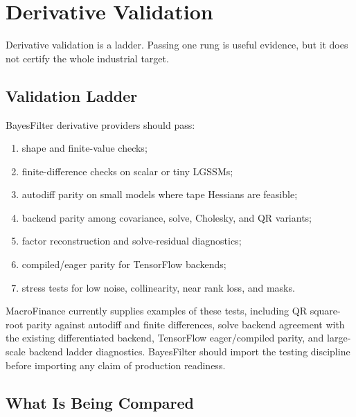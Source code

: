 \chapter{Derivative Validation}
\label{ch:bf-derivative-validation}

Derivative validation is a ladder.  Passing one rung is useful evidence, but it
does not certify the whole industrial target.

\section{Validation Ladder}
\label{sec:bf-derivative-validation-ladder}

BayesFilter derivative providers should pass:
\begin{enumerate}[label=(\roman*)]
  \item shape and finite-value checks;
  \item finite-difference checks on scalar or tiny LGSSMs;
  \item autodiff parity on small models where tape Hessians are feasible;
  \item backend parity among covariance, solve, Cholesky, and QR variants;
  \item factor reconstruction and solve-residual diagnostics;
  \item compiled/eager parity for TensorFlow backends;
  \item stress tests for low noise, collinearity, near rank loss, and masks.
\end{enumerate}

MacroFinance currently supplies examples of these tests, including QR
square-root parity against autodiff and finite differences, solve backend
agreement with the existing differentiated backend, TensorFlow eager/compiled
parity, and large-scale backend ladder diagnostics.  BayesFilter should import
the testing discipline before importing any claim of production readiness.

\section{What Is Being Compared}
\label{sec:bf-validation-comparison-target}

